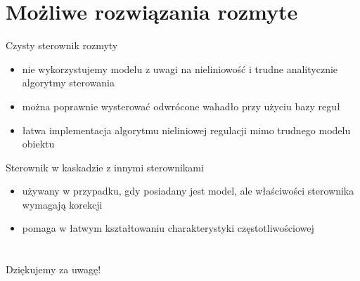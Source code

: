 \section{Możliwe rozwiązania rozmyte}
	\begin{frame}[t]{Czysty sterownik rozmyty}
		\begin{itemize}
			\item nie wykorzystujemy modelu z uwagi na
				nieliniowość i trudne analitycznie algorytmy
				sterowania
				  \pause
				
			\item można poprawnie wysterować odwrócone wahadło
				przy użyciu bazy reguł 
				\pause
				
			\item łatwa implementacja algorytmu nieliniowej regulacji
			    mimo trudnego modelu obiektu
		\end{itemize}
	\end{frame}
	
	\begin{frame}[t]{Sterownik w kaskadzie z innymi sterownikami}
		\begin{itemize}
			\item używany w przypadku, gdy posiadany jest model,
				ale właściwości sterownika wymagają korekcji
				\pause
				
			\item pomaga w łatwym kształtowaniu charakterystyki częstotliwościowej
		\end{itemize}
	\end{frame}
  


\section{}
\begin{frame}
  \begin{center}
    \huge
    Dziękujemy za uwagę!
  \end{center}
 

\end{frame}


